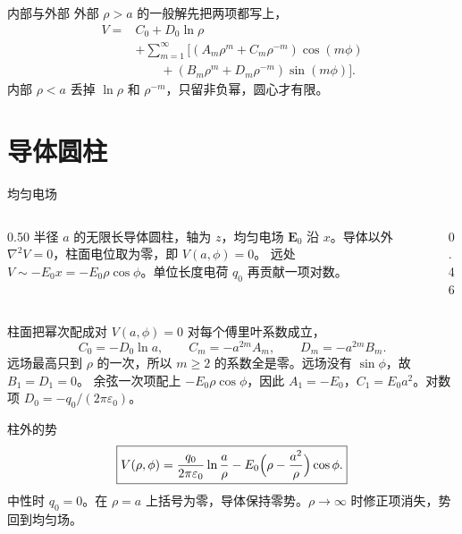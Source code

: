 \documentclass[fontset=windows, chinese, 10pt, xcolor=dvipsnames]{beamer}
\begin{document}
\begin{frame}{内部与外部}
  外部 $\rho>a$ 的一般解先把两项都写上，
  \begin{align*}
    V={}&C_0+D_0\ln\rho\\
    &+\sum_{m=1}^{\infty}\Big[
      (A_m\rho^{m}+C_m\rho^{-m})\cos(m\phi)\\
      &\qquad+(B_m\rho^{m}+D_m\rho^{-m})\sin(m\phi)
    \Big].
  \end{align*}
  内部 $\rho<a$ 丢掉 $\ln\rho$ 和 $\rho^{-m}$，只留非负幂，圆心才有限。
\end{frame}

\section{导体圆柱}

\begin{frame}{均匀电场}
  \begin{columns}[c]
    \begin{column}{0.50\textwidth}
      半径 $a$ 的无限长导体圆柱，轴为 $z$，均匀电场 $\mathbf{E}_0$ 沿 $x$。导体以外 $\nabla^2 V=0$，柱面电位取为零，即 $V(a,\phi)=0$。
      \vspace{0.45em}
      远处 $V\sim -E_0 x=-E_0\rho\cos\phi$。单位长度电荷 $q_0$ 再贡献一项对数。
    \end{column}
    \begin{column}{0.46\textwidth}
      \centering
      \scalebox{0.72}{}
    \end{column}
  \end{columns}
\end{frame}

\begin{frame}{柱面把幂次配成对}
  $V(a,\phi)=0$ 对每个傅里叶系数成立，
  \[
    C_0=-D_0\ln a,
    \qquad
    C_m=-a^{2m}A_m,
    \qquad
    D_m=-a^{2m}B_m.
  \]
  远场最高只到 $\rho$ 的一次，所以 $m\geq 2$ 的系数全是零。远场没有 $\sin\phi$，故 $B_1=D_1=0$。
  \vspace{0.3em}
  余弦一次项配上 $-E_0\rho\cos\phi$，因此 $A_1=-E_0$，$C_1=E_0 a^2$。对数项 $D_0=-q_0/(2\pi\varepsilon_0)$。
\end{frame}

\begin{frame}{柱外的势}
  \begin{equation*}
    \boxed{\displaystyle
      V(\rho,\phi)
      =\frac{q_0}{2\pi\varepsilon_0}\ln\frac{a}{\rho}
       -E_0\Bigl(\rho-\frac{a^2}{\rho}\Bigr)\cos\phi.}
  \end{equation*}
  中性时 $q_0=0$。在 $\rho=a$ 上括号为零，导体保持零势。$\rho\to\infty$ 时修正项消失，势回到均匀场。
\end{frame}
\end{document}
